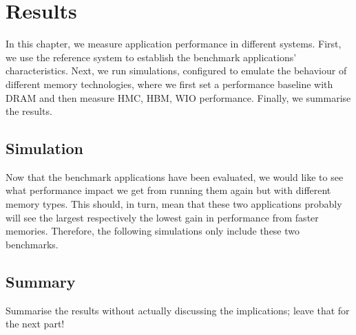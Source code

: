 \chapter{Results}
In this chapter, we measure application performance in different systems. First, we use the reference system to establish the benchmark applications' characteristics. Next, we run simulations, configured to emulate the behaviour of different memory technologies, where we first set a performance baseline with DRAM and then measure HMC, HBM, WIO performance. Finally, we summarise the results.

\section{Simulation}
Now that the benchmark applications have been evaluated, we would like to see what performance impact we get from running them again but with different memory types. This should, in turn, mean that these two applications probably will see the largest respectively the lowest gain in performance from faster memories. Therefore, the following simulations only include these two benchmarks. 

\section{Summary}
Summarise the results without actually discussing the implications; leave that for the next part!